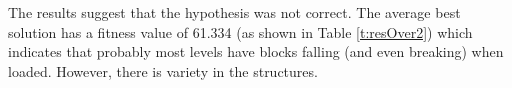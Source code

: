 \documentclass[sigconf]{acmart}
\begin{document}
The results suggest that the hypothesis was not correct. The average best 
solution has a fitness value of 61.334 (as shown in Table \ref{t:resOver2}) 
which indicates that probably most levels have blocks falling (and even 
breaking) when loaded. However, there is variety in the structures.




\end{document}
